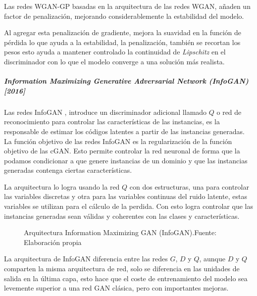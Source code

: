 Las redes \gls{WGAN-GP} \cite{WGAN-GP-gulrajani2017improved} basadas en la arquitectura de las redes \gls{WGAN}, añaden un factor de penalización, mejorando considerablemente la estabilidad del modelo.

Al agregar esta penalización de gradiente, mejora la suavidad en la función de pérdida lo que ayuda a la estabilidad, la penalización, también se recortan los pesos esto ayuda a mantener controlado la continuidad de \textit{Lipschitz} en el discriminador con lo que el modelo converge a una solución más realista.





\subparagraph*{Information Maximizing Generative Adversarial Network (InfoGAN) [2016]}

Las redes \gls{InfoGAN} \cite{InfoGAN-chen2016infogan}, introduce un discriminador adicional llamado ${Q}$ o red de reconocimiento para controlar las características de las instancias, es la  responsable de estimar los códigos latentes a partir de las instancias generadas. La función objetivo de las redes \gls{InfoGAN} es la regularización de la función objetivo de las \gls{cGAN}. Esto permite controlar la red neuronal de forma que la podamos condicionar a que genere instancias de un dominio y que las instancias generadas contenga ciertas características.

La arquitectura lo logra usando la red ${Q}$ con dos estructuras, una para controlar las variables discretas y otra para las variables continuas del ruido latente, estas variables se utilizan para el cálculo de la perdida. Con esto logra controlar que las instancias generadas sean válidas y coherentes con las clases y características.

\begin{figure}[H]
    \centering
    \centerline{}
    \caption{Arquitectura Information Maximizing GAN (InfoGAN).\newline{}Fuente: Elaboración propia}
    \label{fig:InfoGAN}
\end{figure}

La arquitectura de \gls{InfoGAN} diferencia entre las redes ${G}$, ${D}$ y ${Q}$, aunque ${D}$ y ${Q}$ comparten la misma arquitectura de red, solo se diferencia en las unidades de salida en la última capa, esto hace que el coste de entrenamiento del modelo sea levemente superior a una red \gls{GAN} clásica, pero con importantes mejoras.

